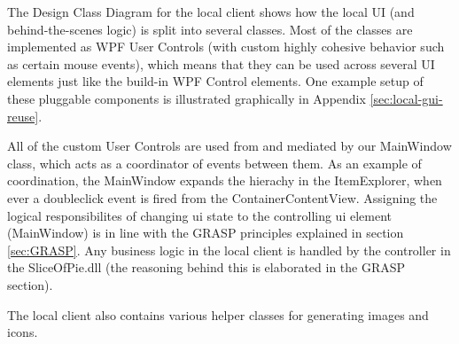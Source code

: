The Design Class Diagram for the local client shows how the local UI (and behind-the-scenes logic) is split into several classes. Most of the classes are implemented as WPF User Controls (with custom highly cohesive behavior such as certain mouse events), which means that they can be used across several UI elements just like the build-in WPF Control elements. One example setup of these pluggable components is illustrated graphically in Appendix  \ref{sec:local-gui-reuse}.

All of the custom User Controls are used from and mediated by our MainWindow class, which acts as a coordinator of events between them. As an example of coordination, the MainWindow expands the hierachy in the ItemExplorer, when ever a doubleclick event is fired from the ContainerContentView. Assigning the logical responsibilites of changing ui state to the controlling ui element (MainWindow) is in line with the GRASP principles explained in section \ref{sec:GRASP}. Any business logic in the local client is handled by the controller in the SliceOfPie.dll (the reasoning behind this is elaborated in the GRASP section).

The local client also contains various helper classes for generating images and icons.
